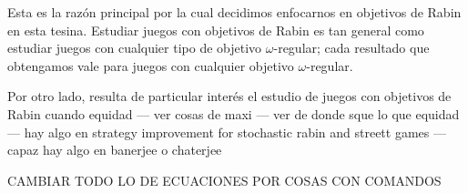 Esta es la razón principal por la cual decidimos enfocarnos en objetivos de
Rabin en esta tesina. Estudiar juegos con objetivos de Rabin es tan general
como estudiar juegos con cualquier tipo de objetivo $\omega$-regular; cada
resultado que obtengamos vale para juegos con cualquier objetivo
$\omega$-regular.

Por otro lado, resulta de particular interés el estudio de juegos con objetivos
de Rabin cuando equidad --- ver cosas de maxi --- ver de donde sque lo que
equidad --- hay algo en strategy improvement for stochastic rabin and streett
games --- capaz hay algo en banerjee o chaterjee

CAMBIAR TODO LO DE ECUACIONES POR COSAS CON COMANDOS